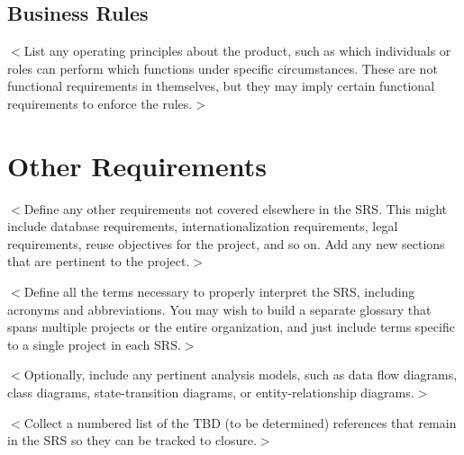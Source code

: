 \documentclass[a4paper, 11pt]{scrreprt}
\begin{document}
\section{Business Rules}
$<$List any operating principles about the product, such as which individuals or 
roles can perform which functions under specific circumstances. These are not 
functional requirements in themselves, but they may imply certain functional 
requirements to enforce the rules.$>$


\chapter{Other Requirements}
$<$Define any other requirements not covered elsewhere in the SRS. This might 
include database requirements, internationalization requirements, legal 
requirements, reuse objectives for the project, and so on. Add any new sections 
that are pertinent to the project.$>$

$<$Define all the terms necessary to properly interpret the SRS, including 
acronyms and abbreviations. You may wish to build a separate glossary that spans 
multiple projects or the entire organization, and just include terms specific to 
a single project in each SRS.$>$

$<$Optionally, include any pertinent analysis models, such as data flow 
diagrams, class diagrams, state-transition diagrams, or entity-relationship 
diagrams.$>$

$<$Collect a numbered list of the TBD (to be determined) references that remain 
in the SRS so they can be tracked to closure.$>$
\end{document}
